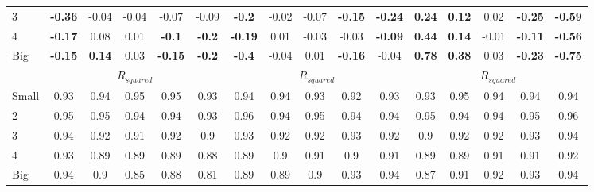\begin{table}[H]
\begin{tabular}{lccccc|ccccc|ccccc}
3 & \textbf{-0.36} & -0.04 & -0.04 & -0.07 & -0.09 & \textbf{-0.2} & -0.02 & -0.07 & \textbf{-0.15} & \textbf{-0.24} & \textbf{0.24} & \textbf{0.12} & 0.02 & \textbf{-0.25} & \textbf{-0.59} \\
4 & \textbf{-0.17} & 0.08 & 0.01 & \textbf{-0.1} & \textbf{-0.2} & \textbf{-0.19} & 0.01 & -0.03 & -0.03 & \textbf{-0.09} & \textbf{0.44} & \textbf{0.14} & -0.01 & \textbf{-0.11} & \textbf{-0.56} \\
Big & \textbf{-0.15} & \textbf{0.14} & 0.03 & \textbf{-0.15} & \textbf{-0.2} & \textbf{-0.4} & -0.04 & 0.01 & \textbf{-0.16} & -0.04 & \textbf{0.78} & \textbf{0.38} & 0.03 & \textbf{-0.23} & \textbf{-0.75} \\
 & \multicolumn{5}{c|}{$R_{squared}$} & \multicolumn{5}{c|}{$R_{squared}$} & \multicolumn{5}{c}{$R_{squared}$} \\
Small & 0.93 & 0.94 & 0.95 & 0.95 & 0.93 & 0.94 & 0.94 & 0.93 & 0.92 & 0.93 & 0.93 & 0.95 & 0.94 & 0.94 & 0.94 \\
2 & 0.95 & 0.95 & 0.94 & 0.94 & 0.93 & 0.96 & 0.94 & 0.95 & 0.94 & 0.94 & 0.95 & 0.94 & 0.94 & 0.95 & 0.96 \\
3 & 0.94 & 0.92 & 0.91 & 0.92 & 0.9 & 0.93 & 0.92 & 0.92 & 0.93 & 0.92 & 0.9 & 0.92 & 0.92 & 0.93 & 0.94 \\
4 & 0.93 & 0.89 & 0.89 & 0.89 & 0.88 & 0.89 & 0.9 & 0.91 & 0.9 & 0.91 & 0.89 & 0.89 & 0.91 & 0.91 & 0.92 \\
Big & 0.94 & 0.9 & 0.85 & 0.88 & 0.81 & 0.89 & 0.89 & 0.9 & 0.93 & 0.94 & 0.87 & 0.91 & 0.92 & 0.93 & 0.94 \\
\end{tabular}
\end{table}
